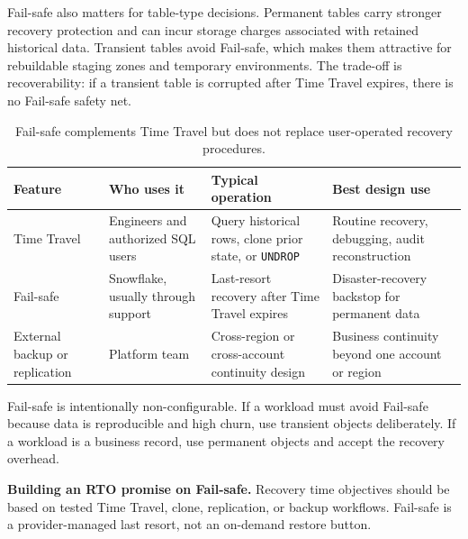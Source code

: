 Fail-safe also matters for table-type decisions. Permanent tables carry stronger recovery protection and can incur storage charges associated with retained historical data. Transient tables avoid Fail-safe, which makes them attractive for rebuildable staging zones and temporary environments. The trade-off is recoverability: if a transient table is corrupted after Time Travel expires, there is no Fail-safe safety net.
\begin{table}[H]
\centering
\small
\begin{tabular}{@{}p{3.0cm}p{3.8cm}p{3.8cm}p{3.4cm}@{}}
\toprule
\textbf{Feature} & \textbf{Who uses it} & \textbf{Typical operation} & \textbf{Best design use} \\
\midrule
Time Travel & Engineers and authorized SQL users & Query historical rows, clone prior state, or \texttt{UNDROP} & Routine recovery, debugging, audit reconstruction \\
Fail-safe & Snowflake, usually through support & Last-resort recovery after Time Travel expires & Disaster-recovery backstop for permanent data \\
External backup or replication & Platform team & Cross-region or cross-account continuity design & Business continuity beyond one account or region \\
\bottomrule
\end{tabular}
\caption{Fail-safe complements Time Travel but does not replace user-operated recovery procedures.}
\label{tab:chapter4-time-travel-failsafe}
\end{table}
\begin{notebox}
Fail-safe is intentionally non-configurable. If a workload must avoid Fail-safe because data is reproducible and high churn, use transient objects deliberately. If a workload is a business record, use permanent objects and accept the recovery overhead.
\end{notebox}
\begin{pitfall}
\textbf{Building an RTO promise on Fail-safe.} Recovery time objectives should be based on tested Time Travel, clone, replication, or backup workflows. Fail-safe is a provider-managed last resort, not an on-demand restore button.
\end{pitfall}
